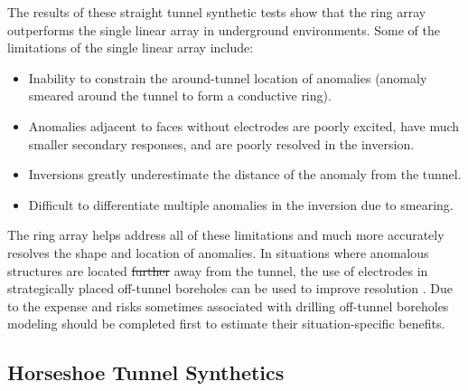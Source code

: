 \documentclass[preprint,authoryear,12pt]{elsarticle}
\providecommand{\DIFaddtex}[1]{{\protect\color{blue}\uwave{#1}}} %
\providecommand{\DIFdeltex}[1]{{\protect\color{red}\sout{#1}}}                      %
\providecommand{\DIFaddbegin}{} %
\providecommand{\DIFaddend}{} %
\providecommand{\DIFdelbegin}{} %
\providecommand{\DIFdelend}{} %
\providecommand{\DIFadd}[1]{\texorpdfstring{\DIFaddtex{#1}}{#1}} %
\providecommand{\DIFdel}[1]{\texorpdfstring{\DIFdeltex{#1}}{}} %
\begin{document}
The results of these straight tunnel synthetic tests show that the ring array outperforms the single linear array in underground environments. Some of the limitations of the single linear array include:
\begin{itemize}
   \item{Inability to constrain the around-tunnel location of anomalies (anomaly smeared around the tunnel to form a conductive ring).}
   \item{Anomalies adjacent to faces without electrodes are poorly excited, have much smaller secondary responses, and are poorly resolved in the inversion.}
   \item{Inversions greatly underestimate the distance of the anomaly from the tunnel.}
   \item{Difficult to differentiate multiple anomalies in the inversion due to smearing.}
\end{itemize}

The ring array helps address all of these limitations and much more accurately resolves the shape and location of anomalies. In situations where anomalous structures are located \DIFdelbegin \DIFdel{further }\DIFdelend \DIFaddbegin \DIFadd{farther }\DIFaddend away from the tunnel, the use of electrodes in strategically placed off-tunnel boreholes can be used to improve resolution \citep{Mitchell2020}. Due to the expense and risks sometimes associated with drilling off-tunnel boreholes modeling should be completed first to estimate their situation-specific benefits.


\DIFdelbegin %

\DIFdelend \subsection{Horseshoe Tunnel Synthetics}
\label{sec:RingArray_Development_Horseshoe_Synth_Intro}
\DIFaddbegin
\end{document}
